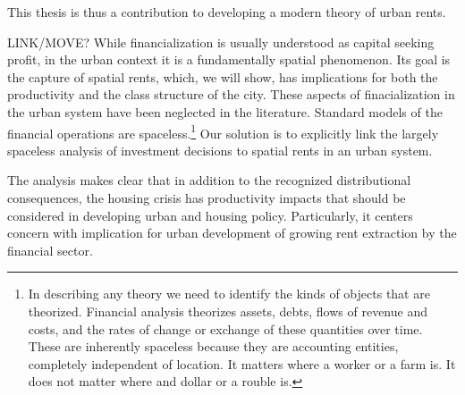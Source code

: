 This thesis  is thus a contribution to developing a modern theory of urban rents.

LINK/MOVE?
While financialization is usually understood as capital seeking profit, in the urban context it is a fundamentally spatial phenomenon. %
Its goal is the capture of spatial rents, which, we will show, has implications for both the productivity and the class structure of the city. These aspects of finacialization in the urban system have been neglected in the literature. Standard models of the financial operations are spaceless.\footnote{In describing any theory we need to identify the kinds of objects that are theorized. Financial analysis theorizes  assets, debts, flows of revenue and costs, and the rates of change or exchange of these quantities over time. These are inherently spaceless because they are accounting entities, completely independent of location. It matters where a worker or a farm is. It does not matter where and dollar or a rouble is.} 
Our solution is to explicitly link the largely spaceless analysis of investment decisions to spatial rents in an urban system. 





The analysis makes clear that in addition to the recognized distributional consequences, the housing crisis has productivity impacts that should be considered in developing urban and housing policy. Particularly, it centers concern with implication for urban development of growing rent extraction by the financial sector. 

